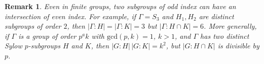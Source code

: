 \documentclass[11pt]{amsart}
\newtheorem{lemma}[theorem]{Lemma}
\newtheorem{remark}[theorem]{Remark}
\theoremstyle{definition}
\theoremstyle{definition}
\numberwithin{equation}{section}
\begin{document}
\begin{remark}{\em Even in finite groups, two subgroups of odd index can have an intersection of even index. For example, if $\Gamma=S_3$ and $H_1, H_2$ are distinct subgroups of order $2$, then $|\Gamma\colon H|=|\Gamma\colon K|=3$ but $|\Gamma\colon H\cap K|=6$. More generally, if $\Gamma$ is a group of order $p^ak$ with $\mbox{gcd}(p,k)=1$, $k>1$, and $\Gamma$ has two distinct Sylow $p$-subgroups $H$ and $K$, then $|G:H|\, |G:K|=k^2$, but $|G:H\cap K|$ is divisible by $p$. }
\end{remark}

\end{document}
